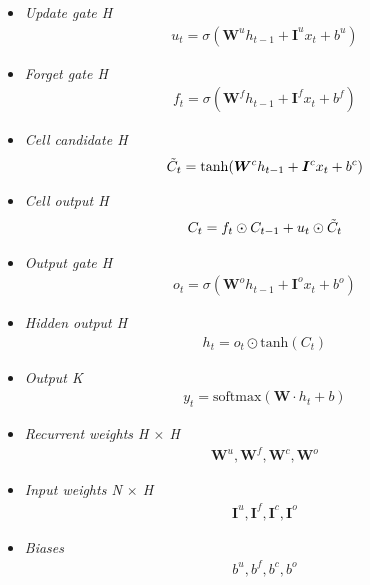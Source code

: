\begin{itemize}
    \item \textit{Update gate H}
        \begin{align}
            u_t = \sigma(\bm{W}^u h_{t-1} + \bm{I}^u x_t + b^u)
        \end{align}
    
    \item \textit{Forget gate H}
        \begin{align}
            f_t = \sigma(\bm{W}^f h_{t-1} + \bm{I}^f x_t + b^f)
        \end{align}
    
    \item \textit{Cell candidate H}
        \begin{align}
            \Tilde{C}_t = \mathrm{tanh}(\bm{W}^c h_{t-1} + \bm{I}^c x_t + b^c)
        \end{align}
    
    \item \textit{Cell output H}
        \begin{align}
            C_t = f_t \odot C_{t-1} + u_t \odot \Tilde{C}_t
        \end{align}
    
    \item \textit{Output gate H}
        \begin{align}
            o_t = \sigma(\bm{W}^o h_{t-1} + \bm{I}^o x_t + b^o)
        \end{align}
    
    \item \textit{Hidden output H}
        \begin{align}
            h_t = o_t \odot \mathrm{tanh}(C_t)
        \end{align}
    
    \item \textit{Output K}
        \begin{align}
            y_t = \mathrm{softmax}(\bm{W} \cdot h_t + b)
        \end{align}
            
    \item \textit{Recurrent weights H $\times$ H}
        \begin{align}
            \bm{W}^u, \bm{W}^f, \bm{W}^c, \bm{W}^o
        \end{align}    
        
    \item \textit{Input weights N $\times$ H}
        \begin{align}
            \bm{I}^u, \bm{I}^f, \bm{I}^c, \bm{I}^o
        \end{align}
            
    \item \textit{Biases}
        \begin{align}
            b^u, b^f, b^c, b^o
        \end{align}
\end{itemize}

